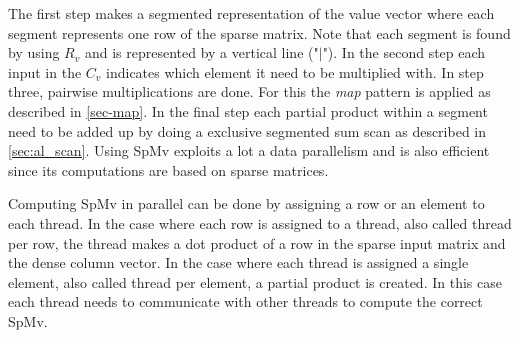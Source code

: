 \begin{center}
	\label{alg-mulex}
\end{center}
The first step makes a segmented representation of the value vector where each segment represents one row of the sparse matrix.
Note that each segment is found by using $R_v$ and is represented by a vertical line ("$|$").
In the second step each input in the $C_v$ indicates which element it need to be multiplied with.
In step three, pairwise multiplications are done.
For this the \textit{map} pattern is applied as described in \autoref{sec-map}.
In the final step each partial product within a segment need to be added up by doing a exclusive segmented sum scan as described in \autoref{sec:al_scan}.
Using SpMv exploits a lot a data parallelism and is also efficient since its computations are based on sparse matrices.

Computing SpMv in parallel can be done by assigning a row or an element to each thread.
In the case where each row is assigned to a thread, also called thread per row, the thread makes a dot product of a row in the sparse input matrix and the dense column vector.
In the case where each thread is assigned a single element, also called thread per element, a partial product is created.
In this case each thread needs to communicate with other threads to compute the correct SpMv.

